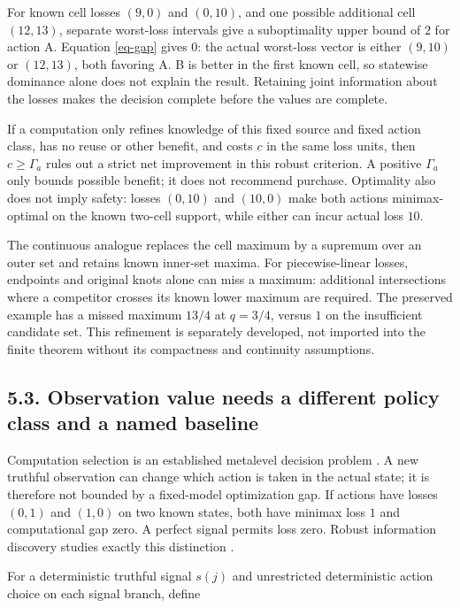 \documentclass{article}
\theoremstyle{definition}
\begin{document}
For known cell losses \((9,0)\) and \((0,10)\), and one possible
additional cell \((12,13)\), separate worst-loss intervals give a
suboptimality upper bound of \(2\) for action A. Equation \ref{eq-gap}
gives \(0\): the actual worst-loss vector is either \((9,10)\) or
\((12,13)\), both favoring A. B is better in the first known cell, so
statewise dominance alone does not explain the result. Retaining joint
information about the losses makes the decision complete before the
values are complete.

If a computation only refines knowledge of this fixed source and fixed
action class, has no reuse or other benefit, and costs \(c\) in the same
loss units, then \(c\geq\Gamma_a\) rules out a strict net improvement in
this robust criterion. A positive \(\Gamma_a\) only bounds possible
benefit; it does not recommend purchase. Optimality also does not imply
safety: losses \((0,10)\) and \((10,0)\) make both actions
minimax-optimal on the known two-cell support, while either can incur
actual loss \(10\).

The continuous analogue replaces the cell maximum by a supremum over an
outer set and retains known inner-set maxima. For piecewise-linear
losses, endpoints and original knots alone can miss a maximum:
additional intersections where a competitor crosses its known lower
maximum are required. The preserved example has a missed maximum
\(13/4\) at \(q=3/4\), versus \(1\) on the insufficient candidate set.
This refinement is separately developed, not imported into the finite
theorem without its compactness and continuity assumptions.

\subsection{5.3. Observation value needs a different policy class and a
named baseline}\label{sec-observation}

Computation selection is an established metalevel decision problem
\citep{hay}. A new truthful observation can change which action is taken
in the actual state; it is therefore not bounded by a fixed-model
optimization gap. If actions have losses \((0,1)\) and \((1,0)\) on two
known states, both have minimax loss \(1\) and computational gap zero. A
perfect signal permits loss zero. Robust information discovery studies
exactly this distinction \citep{paradiso}.

For a deterministic truthful signal \(s(j)\) and unrestricted
deterministic action choice on each signal branch, define
\end{document}
